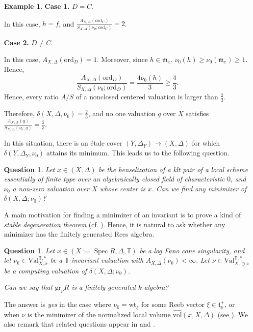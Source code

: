 \documentclass[a4paper,12pt]{amsart}
\newtheorem{question}[theorem]{Question}
\theoremstyle{definition} %
\newtheorem{example}[theorem]{Example}
\theoremstyle{remark}
\numberwithin{equation}{section}
\newcommand{\R}{\mathbb{R}}
\def\Spec{\operatorname{Spec}}
\begin{document}
\begin{example}
\noindent\textbf{Case 1.} $D=C$.

\smallskip

In this case, $h=f$, and $\frac{A_{X,\Delta}(\mathrm{ord}_C)}{S_{X,\Delta}(\nu_0;\mathrm{ord}_C)}=2$.

\smallskip

\noindent\textbf{Case 2.} $D\ne C$.

\smallskip

In this case, $A_{X,\Delta}(\mathrm{ord}_D)=1$. Moreover, since $h\in \mathfrak{m}_x$, $\nu_0(h)\ge \nu_0(\mathfrak{m}_x)\ge 1$. Hence,
$$ \frac{A_{X,\Delta}(\mathrm{ord}_D)}{S_{X,\Delta}(\nu_0;\mathrm{ord}_D)}=\frac{4\nu_0(h)}{3}\ge \frac{4}{3}.$$
Hence, every ratio $A/S$ of a nonclosed centered valuation is larger than $\frac{2}{3}$.

\smallskip

Therefore, $\delta(X,\Delta,\nu_0)=\frac{2}{3}$, and no one valuation $q$ over $X$ satisfies $\frac{A_{X,\Delta}(q)}{S_{X,\Delta}(\nu_0;q)}=\frac{2}{3}$.
\end{example}

In this situation, there is an étale cover $(Y,\Delta_Y)\to (X,\Delta)$ for which $\delta(Y,\Delta_Y,\nu_0)$ attains its minimum. This leads us to the following question.

\begin{question}
Let $x\in (X,\Delta)$ be the henselization of a klt pair of a local scheme essentially of finite type over an algebraically closed field of characteristic $0$, and $\nu_0$ a non-zero valuation over $X$ whose center is $x$. Can we find any minimizer of $\delta(X,\Delta;\nu_0)$?
\end{question}

A main motivation for finding a minimizer of an invariant is to prove a kind of \emph{stable degeneration theorem} (cf. \cite{Blu18, Xu20, XZ20, XZ25}). Hence, it is natural to ask whether any minimizer has the finitely generated Rees algebra.

\begin{question}
Let $x\in (X:=\Spec R,\Delta,\mathbb{T})$ be a log Fano cone singularity, and let $\nu_0\in \mathrm{Val}^{\mathbb{T},*}_{X,x}$ be a $\mathbb{T}$-invariant valuation with $A_{X,\Delta}(\nu_0)<\infty$. Let $\nu\in \mathrm{Val}^{\mathbb{T},*}_{X,\ni x}$ be a computing valuation of $\delta(X,\Delta;\nu_0)$.

\smallskip

Can we say that $\mathrm{gr}_{\nu}R$ is a finitely generated $k$-algebra?
\end{question}

The answer is \emph{yes} in the case where $\nu_0=\mathrm{wt}_{\xi}$ for some Reeb vector $\xi\in \mathfrak{t}^+_{\R}$, or when $\nu$ is the minimizer of the normalized local volume $\widehat{\mathrm{vol}}(x,X,\Delta)$ (see \cite{Hua22, XZ25}). We also remark that related questions appear in \cite[Question 5.3]{BLXZ23} and \cite[Theorem 6.4]{HMQWZ26}.



\end{document}
